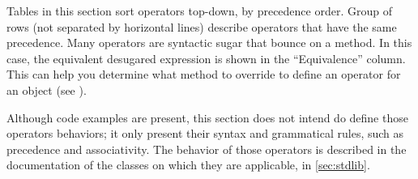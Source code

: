 Tables in this section sort operators top-down, by precedence order.
Group of rows (not separated by horizontal lines) describe operators
that have the same precedence. Many operators are syntactic sugar that
bounce on a method. In this case, the equivalent desugared expression
is shown in the ``Equivalence'' column. This can help you determine
what method to override to define an operator for an object (see
).

Although code examples are present, this section does not intend do
define those operators behaviors; it only present their syntax and
grammatical rules, such as precedence and associativity. The behavior
of those operators is described in the documentation of the classes on
which they are applicable, in \autoref{sec:stdlib}.

\newcommand{\operatorhead}{Operator & Use & Associativity & Original semantic
  & Equivalence\\}


\newcommand{\operator}[6][ ]{\lstinline@#2@&\lstinline@#3@&#4&#5&\lstinline@#6@#1\\}
\newcommand{\boperator}[3]{\operator{#1}{a #1 b}{#2}{#3}{a.'#1'(b)}}
\newcommand{\poperator}[3]{\operator{#1}{#1a}{#2}{#3}{a.'#1'()}}

\newcommand{\operatordot}    {\operator  {.}    {a.b}              {-}     {Message sending}          {Not redefinable}       }
\newcommand{\operatordota}   {\operator  {.}    {a.b(args)}        {-}     {Message sending}          {Not redefinable}       }
\newcommand{\operatorsub}    {\operator  {[]}   {a[args]}          {-}     {Subscript}                {a.'[]'(args)}          }
\newcommand{\operatorsubass} {\operator  {[] =} {a[args] = v}      {-}     {Subscript assignment}     {a.'[]='(args, v)}      }
\newcommand{\operatorass}[2][ ]    {\operator[#1]
                                         {=}    {a = b}            {Right} {Assignment}               {updateSlot("a", b)}    }

\newcommand{\operatoriass}[1]{\operator  {#1=}  {a #1= b}          {Right} {In place assignment}      {a = a #1 b}            }
\newcommand{\operatorsiass}  {
    \operatoriass{+}
    \operatoriass{-}
    \operatoriass{*}
    \operatoriass{/}
    \operatoriass{\%}
    \operatoriass{\^}
    \operatoriass{\~}
}
\newcommand{\operatorinc}    {\operator  {++}   {a++}              {-}     {Incrementation}           {(a = a + 1) - 1}       }
\newcommand{\operatordec}    {\operator  {--}   {a--}              {-}     {Incrementation}           {(a = a - 1) + 1}       }

